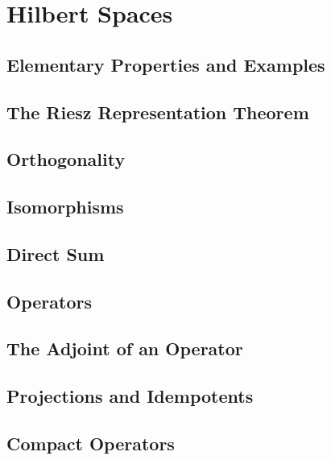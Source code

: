 \chapter{Hilbert Spaces}

\section{Elementary Properties and Examples}


\section{The Riesz Representation Theorem}


\section{Orthogonality}


\section{Isomorphisms}



\section{Direct Sum}



\section{Operators}


\section{The Adjoint of an Operator}


\section{Projections and Idempotents}


\section{Compact Operators}


